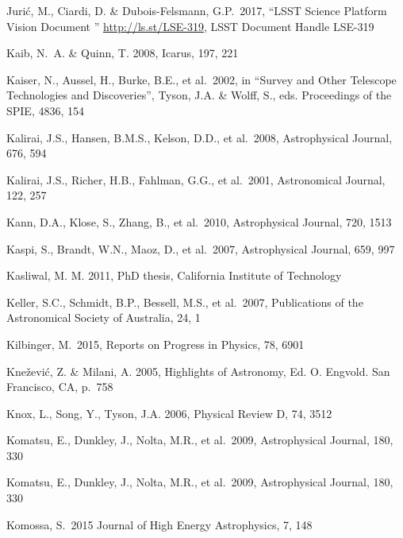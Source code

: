\documentclass[twocolumn]{aastex61}
\begin{document}
\begin{thebibliography}{}
 Juri\'{c}, M., Ciardi, D. \& Dubois-Felsmann, G.P.~2017, ``LSST Science Platform Vision Document '' \url{http://ls.st/LSE-319}, LSST Document Handle LSE-319

\bibitem[()]{} Kaib, N.~A. \& Quinn, T. 2008, Icarus, 197, 221

\bibitem[()]{} Kaiser, N., Aussel, H., Burke, B.E., et al.~2002, in ``Survey and Other Telescope
             Technologies and Discoveries'', Tyson, J.A. \& Wolff, S.,
             eds. Proceedings of the SPIE, 4836, 154

\bibitem[()]{} Kalirai, J.S., Hansen, B.M.S., Kelson, D.D., et al.~2008, Astrophysical Journal, 676, 594

\bibitem[()]{} Kalirai, J.S., Richer, H.B., Fahlman, G.G., et al.~2001, Astronomical Journal, 122, 257


\bibitem[()]{} Kann, D.A., Klose, S., Zhang, B., et al.~2010, Astrophysical Journal, 720, 1513


\bibitem[()]{} Kaspi, S., Brandt, W.N., Maoz, D., et al.~2007, Astrophysical Journal, 659, 997

\bibitem[()]{} Kasliwal, M. M. 2011, PhD thesis, California Institute of Technology

\bibitem[()]{} Keller, S.C., Schmidt, B.P., Bessell, M.S., et al.~2007, Publications of the Astronomical
             Society of Australia, 24, 1

\bibitem[()]{} Kilbinger, M.~2015, Reports on Progress in Physics, 78, 6901

\bibitem[()]{} Kne\v{z}evi\'{c}, Z. \& Milani, A. 2005, Highlights of Astronomy, Ed. O. Engvold. San
             Francisco, CA, p.~758

\bibitem[()]{} Knox, L., Song, Y., Tyson, J.A. 2006, Physical Review D, 74, 3512

\bibitem[()]{} Komatsu, E., Dunkley, J., Nolta, M.R., et al.~2009, Astrophysical Journal, 180, 330

\bibitem[()]{} Komatsu, E., Dunkley, J., Nolta, M.R., et al.~2009, Astrophysical Journal, 180, 330

\bibitem[()]{} Komossa, S.~2015 Journal of High Energy Astrophysics, 7, 148


\end{thebibliography}
\end{document}

